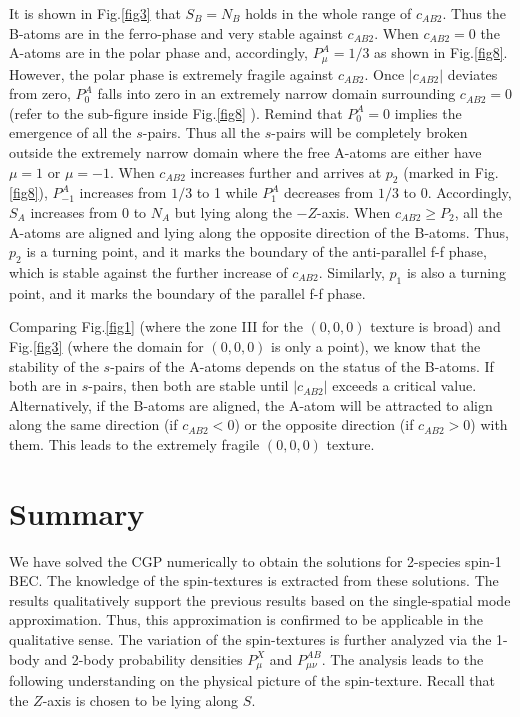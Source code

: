 \documentclass[10pt]{wlscirep}
\begin{document}
It is shown in Fig.\ref{fig3} that $S_{B}=N_{B}$ holds in the whole range of
$c_{AB2}$. Thus the B-atoms are in the ferro-phase and very stable against $%
c_{AB2}$. When $c_{AB2}=0$ the A-atoms are in the polar phase and,
accordingly, $P_{\mu }^{A}=1/3$ as shown in Fig.\ref{fig8}. However, the
polar phase is extremely fragile against $c_{AB2}$. Once $|c_{AB2}|$
deviates from zero, $P_{0}^{A}$ falls into zero in an extremely narrow
domain surrounding $c_{AB2}=0$ (refer to the sub-figure inside Fig.\ref{fig8}%
). Remind that $P_{0}^{A}=0$ implies the emergence of all the $s$-pairs.
Thus all the $s$-pairs will be completely broken
outside the extremely narrow domain where the free
A-atoms are either have $\mu =1$ or $\mu =-1$. When $c_{AB2}$ increases
further and arrives at $p_{2}$ (marked in Fig.\ref{fig8}), $%
P_{-1}^{A}$ increases from $1/3$ to 1 while $P_{1}^{A}$ decreases from $1/3$
to 0. Accordingly, $S_{A}$ increases from 0 to $N_{A}$ but lying along the $%
-Z$-axis. When $c_{AB2}\geq P_{2}$, all the A-atoms are aligned and lying
along the opposite direction of the B-atoms. Thus, $p_{2}$ is
a turning point, and it marks the boundary of the anti-parallel f-f phase,
which is stable against the further increase of $c_{AB2}$. Similarly,
$p_{1}$ is also a turning point, and it marks the boundary of
the parallel f-f phase.

Comparing Fig.\ref{fig1} (where the zone III for the $(0,0,0)$ texture is
broad) and Fig.\ref{fig3} (where the domain for $(0,0,0)$ is only a point),
we know that the stability of the $s$-pairs of the A-atoms depends on the
status of the B-atoms. If both are in $s$-pairs, then both are stable until $%
|c_{AB2}|$ exceeds a critical value. Alternatively, if the B-atoms are
aligned, the A-atom will be attracted to align along the same direction (if $%
c_{AB2}<0$) or the opposite direction (if $c_{AB2}>0$) with them. This leads
to the extremely fragile $(0,0,0)$ texture.



\section*{Summary}

We have solved the CGP numerically to obtain the solutions for 2-species
spin-1 BEC. The knowledge of the spin-textures is extracted from these
solutions. The results qualitatively support the previous results based on
the single-spatial mode approximation. Thus, this approximation is confirmed
to be applicable in the qualitative sense. The variation of the
spin-textures is further analyzed via the 1-body and 2-body probability
densities $P_{\mu }^{X}$ and $P_{\mu \nu }^{AB}$. The analysis leads to the
following understanding on the physical picture of the spin-texture. Recall
that the $Z$-axis is chosen to be lying along $S$.
\end{document}
